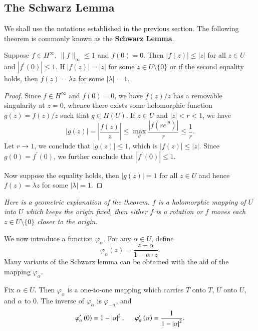 \subsection{The Schwarz Lemma}
We shall use the notations established in the previous section. The following theorem is commonly known as the \textbf{Schwarz Lemma}.
\begin{theorem}
Suppose $f\in H^\infty$, $\|f\|_\infty\le 1$ and $f(0)=0$. Then $|f(z)|\le |z|$ for all $z\in U$ and $|f^\prime(0)|\le 1$. If $|f(z)|=|z|$ for some $z\in U\setminus\{0\}$ or if the second equality holds, then $f(z)=\lambda z$ for some $|\lambda|=1$.
\end{theorem}
\begin{proof}
Since $f\in H^\infty$ and $f(0)=0$, we have $f(z)/z$ has a removable singularity at $z=0$, whence there exists some holomorphic function $g(z)=f(z)/z$ such that $g\in H(U)$. If $z\in U$ and $|z|<r<1$, we have 
$$
\left| g\left( z \right) \right|=\left| \frac{f\left( z \right)}{z} \right|\le \max_{\theta} \frac{\left| f\left( re^{\mathrm{i}\theta} \right) \right|}{r}\le \frac{1}{r}.
$$
Let $r\to 1$, we conclude that $|g(z)|\le 1$, which is $|f(z)|\le |z|$. Since $g(0)=f^\prime(0)$, we further conclude that $|f^\prime(0)|\le 1$.\par
Now suppose the equality holds, then $|g(z)|=1$ for all $z\in U$ and hence $f(z)=\lambda z$ for some $|\lambda|=1$.
\end{proof}
\begin{note}\em
Here is a geometric explanation of the theorem. $f$ is a holomorphic mapping of $U$ into $U$ which keeps the origin fixed, then either $f$ is a rotation or $f$ moves each $z\in U\setminus\{0\}$ closer to the origin.
\end{note}
We now introduce a function $\varphi_\alpha$. For any $\alpha\in U$, define 
$$
\varphi _{\alpha}\left( z \right) =\frac{z-\alpha}{1-\overline{\alpha }\cdot z}.
$$
Many variants of the Schwarz lemma can be obtained with the aid of the mapping $\varphi_\alpha$.
\begin{theorem}
Fix $\alpha\in U$. Then $\varphi_\alpha$ is a one-to-one mapping which carries $T$ onto $T$, $U$ onto $U$, and $\alpha$ to $0$. The inverse of $\varphi_\alpha$ is $\varphi_{-\alpha}$, and 
$$
\varphi _{\alpha}^{\prime}\left( 0 \right) =1-\left| \alpha \right|^2,\hspace{0.5cm}\varphi _{\alpha}^{\prime}\left( \alpha \right) =\frac{1}{1-\left| \alpha \right|^2}.
$$
\end{theorem}

